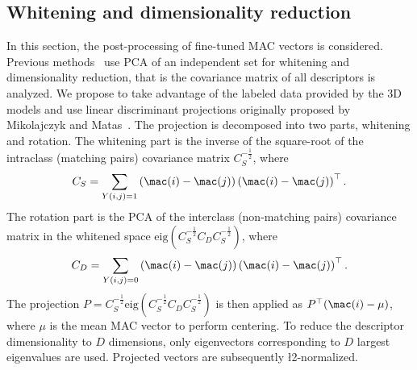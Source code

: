 \subsection{Whitening and dimensionality reduction}
\label{ref:projections}
\vspace{-5pt}
%
In this section, the post-processing of fine-tuned MAC vectors is considered. 
%
Previous methods~\cite{BL15,TSJ16} use PCA of an independent set for whitening and dimensionality reduction, that is the covariance matrix of all descriptors is analyzed. We propose to take advantage of the labeled data provided by the 3D models and use linear discriminant projections originally proposed by Mikolajczyk and Matas~\cite{MM07}. The projection is decomposed into two parts, whitening and rotation. 
The whitening part is the inverse of the square-root of the intraclass (matching pairs) covariance matrix $C_S^{-\frac{1}{2}}$, where 
\vspace{-6pt}
\begin{equation}
C_S = \sum_{Y(i,j)=1} \left(\mac(i) - \mac(j)\right)\left(\mac(i) - \mac(j)\right)^\top.
\end{equation}
The rotation part is the PCA of the interclass (non-matching pairs) covariance matrix in the whitened space $\mathrm{eig}(C_S^{-\frac{1}{2}} C_D C_S^{-\frac{1}{2}})$, where 
\vspace{-6pt}
\begin{equation}
C_D = \sum_{Y(i,j)=0} \left(\mac(i) - \mac(j)\right)\left(\mac(i) - \mac(j)\right)^\top.
\end{equation}
The projection $P = C_S^{-\frac{1}{2}} \mathrm{eig}(C_S^{-\frac{1}{2}} C_D C_S^{-\frac{1}{2}})$ is then applied as $P^\top (\mac(i)-\mu)$, where $\mu$ is the mean MAC vector to perform centering. To reduce the descriptor dimensionality to $D$ dimensions, only eigenvectors corresponding to $D$ largest eigenvalues are used.
Projected vectors are subsequently \l2-normalized.